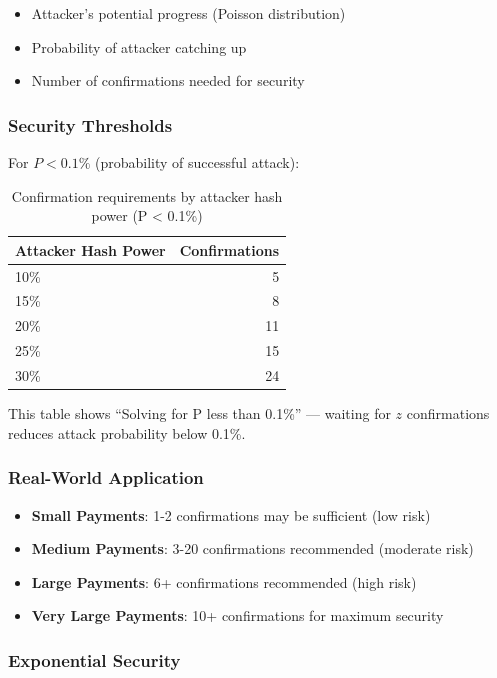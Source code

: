 \begin{itemize}
  \item Attacker's potential progress (Poisson distribution)
  \item Probability of attacker catching up
  \item Number of confirmations needed for security
\end{itemize}

\subsubsection{Security Thresholds}

For $P < 0.1\%$ (probability of successful attack):

\begin{table}[htbp]
\caption{Confirmation requirements by attacker hash power (P < 0.1\%)}
\label{tab:confirmation-security}
\centering\small
\begin{tabularx}{0.5\textwidth}{lr}
\toprule
\textbf{Attacker Hash Power} & \textbf{Confirmations} \\
\midrule
10\% & 5 \\
15\% & 8 \\
20\% & 11 \\
25\% & 15 \\
30\% & 24 \\
\bottomrule
\end{tabularx}
\end{table}

This table shows ``Solving for P less than 0.1\%'' --- waiting for $z$ confirmations reduces attack probability below 0.1\%.

\subsubsection{Real-World Application}

\begin{itemize}
  \item \textbf{Small Payments}: 1-2 confirmations may be sufficient (low risk)
  \item \textbf{Medium Payments}: 3-20 confirmations recommended (moderate risk)
  \item \textbf{Large Payments}: 6+ confirmations recommended (high risk)
  \item \textbf{Very Large Payments}: 10+ confirmations for maximum security
\end{itemize}

\subsubsection{Exponential Security}

